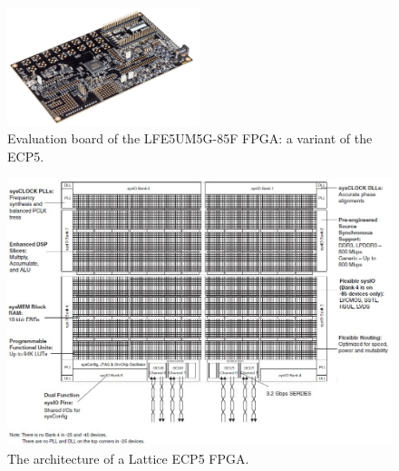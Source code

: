\begin{figure}
\centering
\includegraphics[width=0.5\textwidth]{images/ECP5.png}
\caption[Evaluation board of the LFE5UM5G-85F FPGA: a variant of the ECP5.]{Evaluation board of the LFE5UM5G-85F FPGA: a variant of the ECP5.\footnotemark}
\label{fig:evaluationboard}
\end{figure}


\begin{figure}
\includegraphics[width=\textwidth]{sections/UseCase/image/architecture.jpg}
\caption[The architecture of a Lattice ECP5 FPGA.]{The architecture of a Lattice ECP5 FPGA{\footnotemark}.}
\label{fig:ecp5architecture}
\end{figure}

